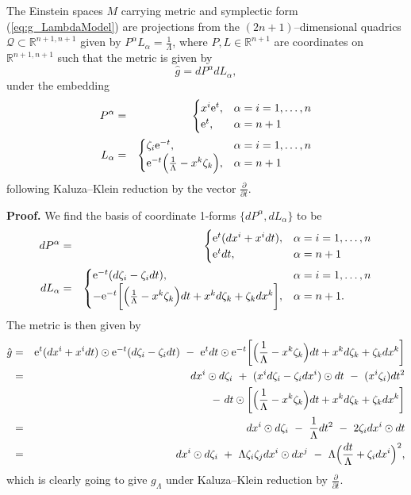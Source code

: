 \begin{prop}
The Einstein spaces $M$ carrying metric and symplectic form (\ref{eq:g_LambdaModel}) are projections from the $(2n+1)$--dimensional quadrics $\mathcal{Q}\subset\mathbb{R}^{n+1,n+1}$
given by $P^{\alpha}L_{\alpha}=\frac{1}{\Lambda}$, where $P,L\in\mathbb{R}^{n+1}$
are coordinates on $\mathbb{R}^{n+1,n+1}$ such that the metric is
given by 
\[
\hat{g}= dP^{\alpha} dL_{\alpha},
\]
 under the embedding
\begin{eqnarray}
P^{\alpha} & = & \begin{cases}
x^{i}\mathrm{e}^{t}, & \alpha=i=1,\dots,n\\
\mathrm{e}^{t}, & \alpha=n+1
\end{cases}\nonumber \\
L_{\alpha} & = & \begin{cases}
\zeta_{i}\mathrm{e}^{-t}, & \alpha=i=1,\dots,n\\
\mathrm{e}^{-t}\Bigl(\frac{1}{\Lambda}-x^{k}\zeta_{k}\Bigr), & \alpha=n+1
\end{cases}\label{eq:embedding-1}
\end{eqnarray}
following Kaluza--Klein reduction by the vector $\frac{\partial}{\partial t}.$
\end{prop}
\textbf{Proof. }We find the basis of coordinate 1-forms $\{ dP^{\alpha}, dL_{\alpha}\}$
to be
\begin{eqnarray*}
 dP^{\alpha} & = & \begin{cases}
\mathrm{e}^{t}( dx^{i}+x^{i} dt), & \alpha=i=1,\dots,n\\
\mathrm{e}^{t} dt, & \alpha=n+1
\end{cases}\\
 dL_{\alpha} & = & \begin{cases}
\mathrm{e}^{-t}( d\zeta_{i}-\zeta_{i} dt), & \alpha=i=1,\dots,n\\
-\mathrm{e}^{-t}\biggl[\Bigl(\frac{1}{\Lambda}-x^{k}\zeta_{k}\Bigr) dt+x^{k} d\zeta_{k}+\zeta_{k} dx^{k}\biggr], & \alpha=n+1.
\end{cases}
\end{eqnarray*}
The metric is then given by
\begin{eqnarray*}
\hat{g} &=& \mathrm{e}^{t}( dx^{i}+x^{i} dt)\odot\mathrm{e}^{-t}( d\zeta_{i}-\zeta_{i} dt)\ -\ \mathrm{e}^{t} dt\odot\mathrm{e}^{-t}\biggl[\Bigl(\frac{1}{\Lambda}-x^{k}\zeta_{k}\Bigr) dt+x^{k} d\zeta_{k}+\zeta_{k} dx^{k}\biggr]\\
 &=&  dx^{i}\odot d\zeta_{i}\ +\ (x^{i} d\zeta_{i}-\zeta_{i} dx^{i})\odot dt\ -\ (x^{i}\zeta_{i}) dt^2\\
 & &-\  dt\odot\biggl[\Bigl(\frac{1}{\Lambda}-x^{k}\zeta_{k}\Bigr) dt+x^{k} d\zeta_{k}+\zeta_{k} dx^{k}\biggr]\\
 &=&  dx^{i}\odot d\zeta_{i}\ -\ \frac{1}{\Lambda} dt^2\ -\ 2\zeta_{i} dx^{i}\odot dt\\
 &=&  dx^{i}\odot d\zeta_{i}\ +\ \Lambda\zeta_{i}\zeta_j dx^{i}\odot dx^j\ -\ \Lambda\Bigl(\frac{ dt}{\Lambda}+\zeta_{i} dx^{i}\Bigr)^{2},
\end{eqnarray*}
which is clearly going to give $g_{\Lambda}$ under Kaluza--Klein reduction
by $\frac{\partial}{\partial t}$.
\koniec

